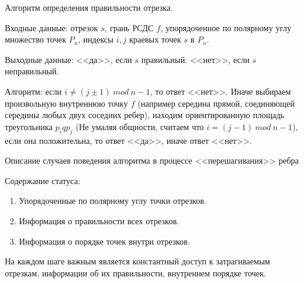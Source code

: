 \documentclass[letterpaper,12pt]{article}
\begin{document}
\begin{center}
      Алгоритм определения правильности отрезка.
\end{center}

Входные данные: отрезок $s$, грань РСДС $f$, упорядоченное по 
полярному углу множество точек $P_u$, индексы $i, j$ краевых точек $s$
в $P_u$.

Выходные данные: <<да>>, если $s$ правильный. <<нет>>, если $s$ 
неправильный. 

Алгоритм: если $i \neq (j \pm 1) \ mod \ n-1$, то ответ <<нет>>. Иначе 
выбираем произвольную внутреннюю точку $f$ (например середина прямой, 
соединяющей середины любых двух соседних ребер), находим ориентированную
площадь треугольника $p_i q p_j$ (Не умаляя общности, считаем что 
$i = (j - 1) \ mod \ n-1$), если она положительна, то ответ <<да>>, иначе
ответ <<нет>>.

\begin{center}
Описание случаев поведения алгоритма в процессе <<перешагивания>> ребра
\end{center}
Содержание статуса: 
\begin{enumerate}
      \item Упорядоченные по полярному углу точки отрезков.
      \item Информация о правильности всех отрезков.
      \item Информация о порядке точек внутри отрезков.
\end{enumerate}

На каждом шаге важным является константный доступ к затрагиваемым
отрезкам, информации об их правильности, внутреннем порядке точек.
\end{document}
